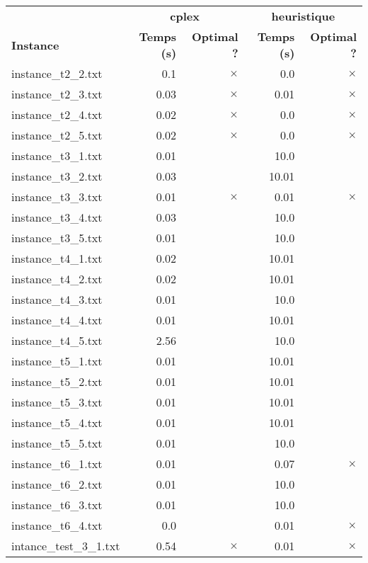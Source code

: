\documentclass{article}
\begin{document}
\newpage
\begin{center}
\renewcommand{\arraystretch}{1.4} 
 \begin{tabular}{lrrrr}
	\hline
 & \multicolumn{2}{c}{\textbf{cplex}} & \multicolumn{2}{c}{\textbf{heuristique}}\\
\textbf{Instance}  & \textbf{Temps (s)} & \textbf{Optimal ?}  & \textbf{Temps (s)} & \textbf{Optimal ?} \\\hline

instance\_t2\_2.txt & 0.1 & 
$\times$
 & 0.0 & 
$\times$
\\
instance\_t2\_3.txt & 0.03 & 
$\times$
 & 0.01 & 
$\times$
\\
instance\_t2\_4.txt & 0.02 & 
$\times$
 & 0.0 & 
$\times$
\\
instance\_t2\_5.txt & 0.02 & 
$\times$
 & 0.0 & 
$\times$
\\
instance\_t3\_1.txt & 0.01 & 
 & 10.0 & 
\\
instance\_t3\_2.txt & 0.03 & 
 & 10.01 & 
\\
instance\_t3\_3.txt & 0.01 & 
$\times$
 & 0.01 & 
$\times$
\\
instance\_t3\_4.txt & 0.03 & 
 & 10.0 & 
\\
instance\_t3\_5.txt & 0.01 & 
 & 10.0 & 
\\
instance\_t4\_1.txt & 0.02 & 
 & 10.01 & 
\\
instance\_t4\_2.txt & 0.02 & 
 & 10.01 & 
\\
instance\_t4\_3.txt & 0.01 & 
 & 10.0 & 
\\
instance\_t4\_4.txt & 0.01 & 
 & 10.01 & 
\\
instance\_t4\_5.txt & 2.56 & 
 & 10.0 & 
\\
instance\_t5\_1.txt & 0.01 & 
 & 10.01 & 
\\
instance\_t5\_2.txt & 0.01 & 
 & 10.01 & 
\\
instance\_t5\_3.txt & 0.01 & 
 & 10.01 & 
\\
instance\_t5\_4.txt & 0.01 & 
 & 10.01 & 
\\
instance\_t5\_5.txt & 0.01 & 
 & 10.0 & 
\\
instance\_t6\_1.txt & 0.01 & 
 & 0.07 & 
$\times$
\\
instance\_t6\_2.txt & 0.01 & 
 & 10.0 & 
\\
instance\_t6\_3.txt & 0.01 & 
 & 10.0 & 
\\
instance\_t6\_4.txt & 0.0 & 
 & 0.01 & 
$\times$
\\
intance\_test\_3\_1.txt & 0.54 & 
$\times$
 & 0.01 & 
$\times$
\\
\hline\end{tabular}
\end{center}
\end{document}

